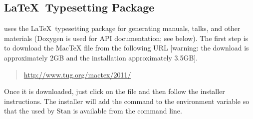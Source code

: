 \subsection{\LaTeX\ Typesetting Package}

\CmdStan uses the \LaTeX\ typesetting package for generating manuals,
talks, and other materials (Doxygen is used for API documentation; see
below).  The first step is to download the MacTeX  file
from the following URL [warning: the download is approximately 2GB and
the installation approximately 3.5GB].
%
\begin{quote}
\url{http://www.tug.org/mactex/2011/}
\end{quote}
%
Once it is downloaded, just click on the  file and then
follow the installer instructions.  The installer will add the command
to the  environment variable so that the 
used by Stan is available from the command line.



